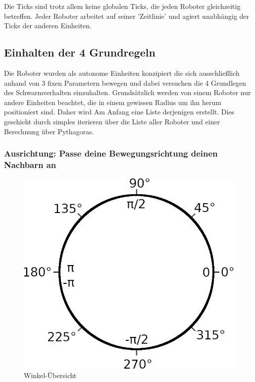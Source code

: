 Die Ticks sind trotz allem keine globalen Ticks, die jeden Roboter gleichzeitig betreffen. Jeder Roboter arbeitet auf seiner 'Zeitlinie' und agiert unabhängig der Ticks der anderen Einheiten.

\subsection*{Einhalten der 4 Grundregeln}
Die Roboter wurden als autonome Einheiten konzipiert die sich ausschließlich anhand von 3 fixen Parametern bewegen und dabei versuchen die 4 Grundlegen des Schwarmverhalten einzuhalten. Grundsätzlich werden von einem Roboter nur andere Einheiten beachtet, die in einem gewissen Radius um ihn herum positioniert sind. Daher wird Am Anfang eine Liste derjenigen erstellt. Dies geschieht durch simples iterieren über die Liste aller Roboter und einer Berechnung über Pythagoras.

\subsubsection*{Ausrichtung: Passe deine Bewegungsrichtung deinen Nachbarn an}

\begin{figure}
	\includegraphics[width=\pictureWidth,keepaspectratio]{graphics/WinkelTemplate.png}
	\caption{Winkel-Übersicht}
	\label{pic:WinkelUebersicht}
\end{figure}

